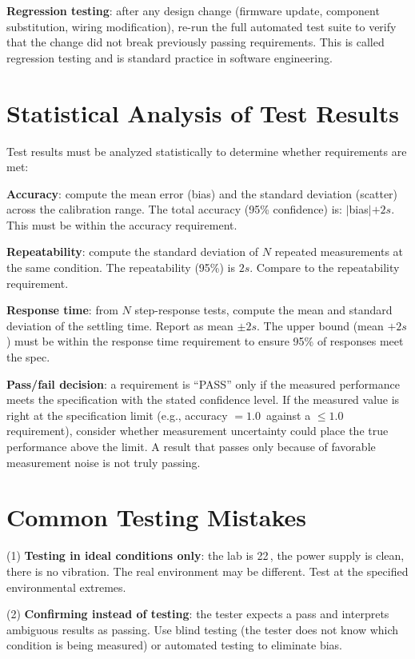 \textbf{Regression testing}: after any design change (firmware update, component substitution, wiring modification), re-run the full automated test suite to verify that the change did not break previously passing requirements. This is called regression testing and is standard practice in software engineering.

\section{Statistical Analysis of Test Results}
Test results must be analyzed statistically to determine whether requirements are met:

\textbf{Accuracy}: compute the mean error (bias) and the standard deviation (scatter) across the calibration range. The total accuracy (95\% confidence) is: $|$bias$| + 2s$. This must be within the accuracy requirement.

\textbf{Repeatability}: compute the standard deviation of $N$ repeated measurements at the same condition. The repeatability (95\%) is $2s$. Compare to the repeatability requirement.

\textbf{Response time}: from $N$ step-response tests, compute the mean and standard deviation of the settling time. Report as mean $\pm 2s$. The upper bound (mean $+ 2s$) must be within the response time requirement to ensure 95\% of responses meet the spec.

\textbf{Pass/fail decision}: a requirement is ``PASS'' only if the measured performance meets the specification with the stated confidence level. If the measured value is right at the specification limit (e.g., accuracy $= 1.0$\,\degC{} against a $\leq 1.0$\,\degC{} requirement), consider whether measurement uncertainty could place the true performance above the limit. A result that passes only because of favorable measurement noise is not truly passing.

\section{Common Testing Mistakes}
(1) \textbf{Testing in ideal conditions only}: the lab is 22\,\degC{}, the power supply is clean, there is no vibration. The real environment may be different. Test at the specified environmental extremes.

(2) \textbf{Confirming instead of testing}: the tester expects a pass and interprets ambiguous results as passing. Use blind testing (the tester does not know which condition is being measured) or automated testing to eliminate bias.

